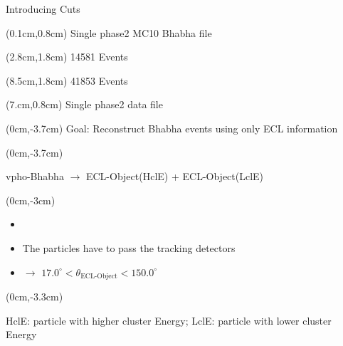 \documentclass[8pt]{beamer}
\begin{document}
\begin{frame}{Introducing Cuts}
\begin{textblock*}{5cm}(0.1cm,0.8cm)
	\centering
	Single phase2 MC10 Bhabha file
\end{textblock*}


\begin{textblock*}{4cm}(2.8cm,1.8cm)
	14581 Events
\end{textblock*}
\pause[5]

\begin{textblock*}{4cm}(8.5cm,1.8cm)
	41853 Events
\end{textblock*}


\begin{textblock*}{4cm}(7.cm,0.8cm)
	Single phase2 data file
\end{textblock*}


\pause[6]



\pause[1]




		


	
\begin{textblock*}{11cm}(0cm,-3.7cm)
				Goal: Reconstruct Bhabha events using only ECL information

	\end{textblock*}
\begin{textblock*}{11cm}(0cm,-3.7cm)	
	\begin{center}
		
		vpho-Bhabha $\rightarrow$ ECL-Object(HclE) + ECL-Object(LclE)		
	\end{center}
\end{textblock*}
\pause[2]
	\begin{textblock*}{11cm}(0cm,-3cm)
	
	\begin{itemize}
		\item[]
		\item The particles have to pass the tracking detectors
		\item[] $\rightarrow$ $17.0^{\circ} < \theta_{\textrm{ECL-Object}} < 150.0^{\circ}$

	\end{itemize}	
\end{textblock*}


\pause[1]
\begin{textblock*}{11cm}(0cm,-3.3cm)
	\begin{center}
		\footnotesize{HclE: particle with higher cluster Energy; LclE: particle with lower cluster Energy}
	\end{center}
\end{textblock*}


\end{frame}
\end{document}
